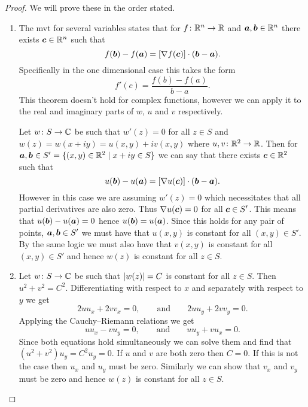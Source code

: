 \documentclass{article}
\newcommand{\st}{\mid}
\begin{document}
    \begin{proof}
        We will prove these in the order stated.
        \begin{enumerate}[label=(\roman*)]
            \item The \gls{mvt} for several variables states that for \(f\colon\mathbb{R}^n\to\mathbb{R}\) and \(\bm{a}, \bm{b}\in\mathbb{R}^n\) there exists \(\bm{c}\in\mathbb{R}^n\) such that
            \[f(\bm{b}) - f(\bm{a}) = [\nabla f(\bm{c})] \cdot (\bm{b} - \bm{a}).\]
            Specifically in the one dimensional case this takes the form
            \[f'(c) = \frac{f(b) - f(a)}{b - a}.\]
            This theorem doesn't hold for complex functions, however we can apply it to the real and imaginary parts of \(w\), \(u\) and \(v\) respectively.
            
            Let \(w\colon S\to\mathbb{C}\) be such that \(w'(z) = 0\) for all \(z\in S\) and \(w(z) = w(x + iy) = u(x, y) + iv(x, y)\) where \(u, v\colon\mathbb{R}^2\to\mathbb{R}\).
            Then for \(\vv{a}, \vv{b}\in S' = \{(x, y)\in\reals^2\st x + iy\in S\}\) we can say that there exists \(\bm{c}\in\mathbb{R}^2\) such that
            \[u(\bm{b}) - u(\bm{a}) = [\nabla u(\bm{c})]\cdot(\bm{b} - \bm{a}).\]
            However in this case we are assuming \(w'(z) = 0\) which necessitates that all partial derivatives are also zero.
            Thus \(\nabla u(\bm{c}) = 0\) for all \(\bm{c}\in S'\).
            This means that \(u(\bm{b}) - u(\bm{a}) = 0\) hence \(u(\bm{b}) = u(\bm{a})\).
            Since this holds for any pair of points, \(\bm{a}, \bm{b}\in S'\) we must have that \(u(x, y)\) is constant for all \((x, y)\in S'\).
            By the same logic we must also have that \(v(x, y)\) is constant for all \((x, y)\in S'\) and hence \(w(z)\) is constant for all \(z\in S\).
            
            \item Let \(w\colon S\to\mathbb{C}\) be such that \(\abs{w(z)} = C\) is constant for all \(z\in S\).
            Then \(u^2 + v^2 = C^2\).
            Differentiating with respect to \(x\) and separately with respect to \(y\) we get
            \[2uu_x + 2vv_x = 0, \qquad\text{and}\qquad 2uu_y + 2vv_y = 0.\]
            Applying the Cauchy--Riemann relations we get
            \[uu_x - vu_y = 0, \qquad\text{and}\qquad uu_y + vu_x = 0.\]
            Since both equations hold simultaneously we can solve them and find that \((u^2 + v^2)u_y = C^2u_y = 0\).
            If \(u\) and \(v\) are both zero then \(C = 0\).
            If this is not the case then \(u_x\) and \(u_y\) must be zero.
            Similarly we can show that \(v_x\) and \(v_y\) must be zero and hence \(w(z)\) is constant for all \(z\in S\).
        \end{enumerate}
    \end{proof}
    
\end{document}
